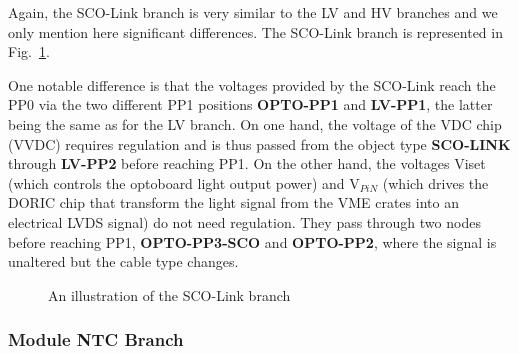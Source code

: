 Again, the SCO-Link branch is very similar to the LV and HV branches
and we only mention here significant differences. The SCO-Link branch is represented in Fig.~\ref{fig:branch_scolink}.

One notable difference is that the voltages provided by the SCO-Link reach the PP0 via 
the two different PP1 positions {\bf OPTO-PP1} and {\bf LV-PP1}, the latter being the same as for the
LV branch. On one hand, the voltage of the VDC
chip (VVDC) requires regulation and is thus passed from the object type 
{\bf SCO-LINK} through {\bf LV-PP2} before reaching PP1. On the other hand, the voltages
Viset (which controls the optoboard light output power) and V$_{PiN}$ (which drives the DORIC 
chip that transform the light signal from the VME crates into an electrical LVDS signal) do not
need regulation. They pass through two nodes before reaching PP1, {\bf OPTO-PP3-SCO} and
{\bf OPTO-PP2}, where the signal is unaltered but the cable type changes.

\begin{figure}
\begin{center}
\end{center}
\caption{An illustration of the SCO-Link branch}
\label{fig:branch_scolink}
\end{figure}

\subsubsection{Module NTC Branch}
\label{sec:mod_ntc}

